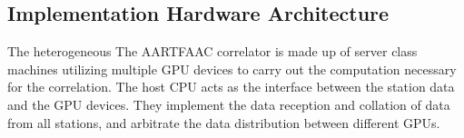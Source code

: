 \documentclass{ws-jai}
\begin{document}

\subsection  {Implementation  Hardware  Architecture} 
The heterogeneous  The AARTFAAC correlator  is made  up of server  class machines
utilizing multiple  GPU devices to carry  out the computation necessary  for the
correlation.  The  host CPU acts as  the interface between the  station data and
the GPU devices.   They implement the data reception and  collation of data from
all stations, and arbitrate the data distribution between different GPUs.




\end{document}
